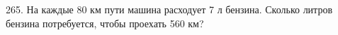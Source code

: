 265. На каждые 80 км пути машина расходует 7 л бензина. Сколько литров бензина потребуется, чтобы проехать 560 км?\\
